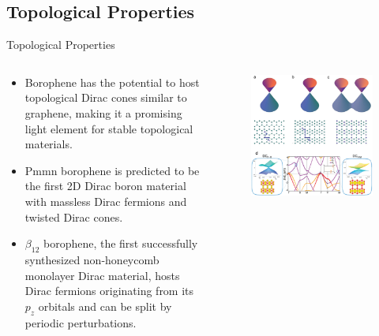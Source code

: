 \documentclass[handout,t]{beamer}
\begin{document}
\subsection{Topological Properties}
\begin{frame}{Topological Properties}
	\begin{columns}
		\begin{column}[t]{0.7\linewidth}
			\begin{itemize}
				\item Borophene has the potential to host topological Dirac cones similar to graphene, making it a promising light element for stable topological materials.
				\item Pmmn borophene is predicted to be the first 2D Dirac boron material with massless Dirac fermions and twisted Dirac cones.
				\item $\beta_{12}$ borophene, the first successfully synthesized non-honeycomb monolayer Dirac material, hosts Dirac fermions originating from its $p_z$ orbitals and can be split by periodic perturbations.
			\end{itemize}
		\end{column}
		\begin{column}[t]{0.5\linewidth}
			\begin{figure}
				\centering
				\includegraphics[width=\linewidth]{../figures/Diraccone.png}
			\end{figure}
		\end{column}
	\end{columns}
\end{frame}
\end{document}
